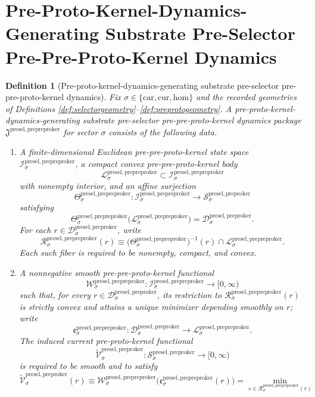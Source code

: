 \documentclass[11pt]{article}
\newcommand{\Car}{\mathrm{car}}
\newcommand{\Cur}{\mathrm{cur}}
\newcommand{\Hom}{\mathrm{hom}}
\newcommand{\PreProtoKernelSpace}[1]{\mathcal S_{#1}^{\mathrm{presel,preproker}}}
\newcommand{\PreProtoKernelBody}[1]{\mathcal D_{#1}^{\mathrm{presel,preproker}}}
\newcommand{\PrePreProtoKernelPackage}{\mathfrak J^{\mathrm{presel,prepreproker}}}
\newcommand{\PrePreProtoKernelSpace}[1]{\mathcal I_{#1}^{\mathrm{presel,prepreproker}}}
\newcommand{\PrePreProtoKernelBody}[1]{\mathcal L_{#1}^{\mathrm{presel,prepreproker}}}
\newcommand{\PrePreProtoKernelProj}[1]{\Theta_{#1}^{\mathrm{presel,prepreproker}}}
\newcommand{\PrePreProtoKernelFiber}[2]{\mathcal R_{#1}^{\mathrm{presel,prepreproker}}(#2)}
\newcommand{\PrePreProtoKernelFunctional}[1]{\mathscr W_{#1}^{\mathrm{presel,prepreproker}}}
\newcommand{\PrePreProtoKernelMinLift}[1]{\mathfrak e_{#1}^{\mathrm{presel,prepreproker}}}
\newcommand{\InducedPreProtoKernelFunctional}[1]{\widetilde{\mathscr V}_{#1}^{\mathrm{presel,preproker}}}
\newtheorem{definition}{Definition}
\begin{document}
\section{Pre-Proto-Kernel-Dynamics-Generating Substrate Pre-Selector Pre-Pre-Proto-Kernel Dynamics}

\begin{definition}[Pre-proto-kernel-dynamics-generating substrate pre-selector pre-pre-proto-kernel dynamics]
\label{def:prepreproto}
Fix \(\sigma\in\{\Car,\Cur,\Hom\}\) and the recorded geometries of Definitions \ref{def:selectorgeometry}--\ref{def:preprotogeometry}. A \emph{pre-proto-kernel-dynamics-generating substrate pre-selector pre-pre-proto-kernel dynamics package} \(\PrePreProtoKernelPackage\) for sector \(\sigma\) consists of the following data.
\begin{enumerate}
    \item A finite-dimensional Euclidean pre-pre-proto-kernel state space \(\PrePreProtoKernelSpace{\sigma}\), a compact convex pre-pre-proto-kernel body
    \[
    \PrePreProtoKernelBody{\sigma}\subset\PrePreProtoKernelSpace{\sigma}
    \]
    with nonempty interior, and an affine surjection
    \[
    \PrePreProtoKernelProj{\sigma}:\PrePreProtoKernelSpace{\sigma}\to\PreProtoKernelSpace{\sigma}
    \]
    satisfying
    \[
    \PrePreProtoKernelProj{\sigma}\bigl(\PrePreProtoKernelBody{\sigma}\bigr)=\PreProtoKernelBody{\sigma}.
    \]
    For each \(r\in\PreProtoKernelBody{\sigma}\), write
    \[
    \PrePreProtoKernelFiber{\sigma}{r}
    \equiv
    \bigl(\PrePreProtoKernelProj{\sigma}\bigr)^{-1}(r)\cap\PrePreProtoKernelBody{\sigma}.
    \]
    Each such fiber is required to be nonempty, compact, and convex.
    \item A nonnegative smooth pre-pre-proto-kernel functional
    \[
    \PrePreProtoKernelFunctional{\sigma}:\PrePreProtoKernelSpace{\sigma}\to[0,\infty)
    \]
    such that, for every \(r\in\PreProtoKernelBody{\sigma}\), its restriction to \(\PrePreProtoKernelFiber{\sigma}{r}\) is strictly convex and attains a unique minimizer depending smoothly on \(r\); write
    \[
    \PrePreProtoKernelMinLift{\sigma}:\PreProtoKernelBody{\sigma}\to\PrePreProtoKernelBody{\sigma}.
    \]
    The induced current pre-proto-kernel functional
    \[
    \InducedPreProtoKernelFunctional{\sigma}:\PreProtoKernelSpace{\sigma}\to[0,\infty)
    \]
    is required to be smooth and to satisfy
    \[
    \InducedPreProtoKernelFunctional{\sigma}(r)
    \equiv
    \PrePreProtoKernelFunctional{\sigma}\bigl(\PrePreProtoKernelMinLift{\sigma}(r)\bigr)
    =
    \min_{s\in\PrePreProtoKernelFiber{\sigma}{r}}
\]
\end{enumerate}
\end{definition}
\end{document}
